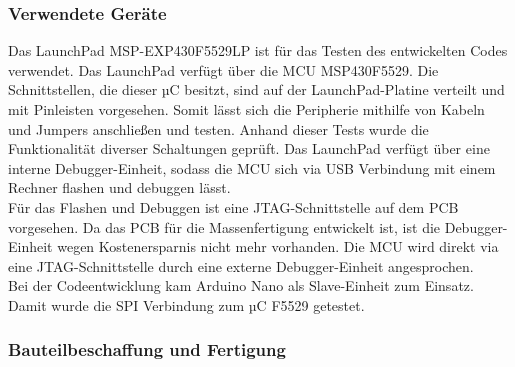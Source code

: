 \subsubsection{Verwendete Geräte}
Das LaunchPad MSP-EXP430F5529LP ist für das Testen des entwickelten Codes verwendet. Das LaunchPad verfügt über die MCU MSP430F5529. Die Schnittstellen, die dieser µC besitzt, sind auf der LaunchPad-Platine verteilt und mit Pinleisten vorgesehen. Somit lässt sich die Peripherie mithilfe von Kabeln und Jumpers anschließen und testen. Anhand dieser Tests wurde die Funktionalität diverser Schaltungen geprüft. Das LaunchPad verfügt über eine interne Debugger-Einheit, sodass die MCU sich via USB Verbindung mit einem Rechner  flashen und debuggen lässt.\\
Für das Flashen und Debuggen ist eine JTAG-Schnittstelle auf dem PCB vorgesehen. Da das PCB für die Massenfertigung entwickelt ist, ist die Debugger-Einheit wegen Kostenersparnis nicht mehr vorhanden. Die MCU wird direkt via eine JTAG-Schnittstelle durch eine externe Debugger-Einheit angesprochen.\\
Bei der Codeentwicklung kam Arduino Nano als Slave-Einheit zum Einsatz. Damit wurde die SPI Verbindung zum µC F5529 getestet. 
\subsubsection{Bauteilbeschaffung und Fertigung} 
